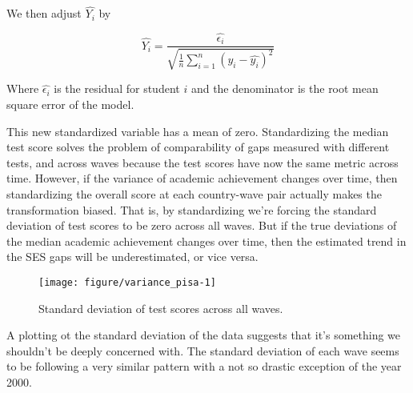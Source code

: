 \documentclass[11pt, a4paper]{article}\usepackage[]{graphicx}\usepackage[]{color}
\begin{document}
We then adjust \begin{math} \hat{Y_i} \end{math} by

\begin{equation}
\hat{Y_i} = \frac{\hat{\epsilon_i}}{\sqrt{\frac{1}{n} \sum_{i=1}^{n} (y_i - \hat{y_i})^2}}
\end{equation}


Where \begin{math}\hat{\epsilon_i}\end{math} is the residual for student \begin{math}i\end{math} and the denominator is the root mean square error of the model.

This new standardized variable has a mean of zero. Standardizing the median test score solves the problem of comparability of gaps measured with different tests, and across waves because the test scores have now the same metric across time. However, if the variance of academic achievement changes over time, then standardizing the overall score at each country-wave pair actually makes the transformation biased. That is, by standardizing we're forcing the standard deviation of test scores to be zero across all waves. But if the true deviations of the median academic achievement changes over time, then the estimated trend in the SES gaps will be underestimated, or vice versa.


\begin{figure}
\begin{center}


{\centering \texttt{[image: figure/variance\_pisa-1]} 

}



\caption{Standard deviation of test scores across all waves.}
\end{center}
\end{figure}

A plotting ot the standard deviation of the data suggests that it's something we shouldn't be deeply concerned with. The standard deviation of each wave seems to be following a very similar pattern with a not so drastic exception of the year 2000.
\end{document}
